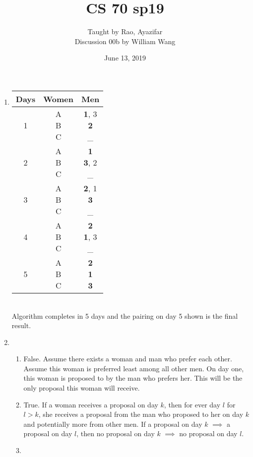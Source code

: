 \documentclass[a4paper]{article}
\title{\textbf{CS 70 sp19}}
\author{\large Taught by Rao, Ayazifar\\
Discussion 00b by William Wang}
\date{June 13, 2019}
\newcommand{\<}{\langle}
\renewcommand{\>}{\rangle}
\renewcommand{\^}{\wedge}
\begin{document}
\maketitle
\begin{enumerate}
    \item 
    \begin{tabular}{|c|c|c|}
    \hline
    Days & Women & Men \\
    \hline
    1 & \makecell{A \\ B \\ C} & \makecell{\textbf{1}, 3 \\ \textbf{2} \\ _} \\
    \hline
    2 & \makecell{A \\ B \\ C} & \makecell{\textbf{1} \\ \textbf{3}, 2 \\ _} \\
    \hline
    3 & \makecell{A \\ B \\ C} & \makecell{\textbf{2}, 1 \\ \textbf{3} \\ _} \\
    \hline
    4 & \makecell{A \\ B \\ C} & \makecell{\textbf{2} \\ \textbf{1}, 3 \\ _} \\
    \hline
    5 & \makecell{A \\ B \\ C} & \makecell{\textbf{2} \\ \textbf{1} \\ \textbf{3}} \\
    \hline
    \end{tabular}
    \\Algorithm completes in 5 days and the pairing on day 5 shown is the final result.
    \item
    \begin{enumerate}
        \item False. Assume there exists a woman and man who prefer each other. Assume this woman is preferred least among all other men. On day one, this woman is proposed to by the man who prefers her. This will be the only proposal this woman will receive.
        \item True. If a woman receives a proposal on day $k$, then for ever day $l$ for $l > k$, she receives a proposal from the man who proposed to her on day $k$ and potentially more from other men. If a proposal on day $k$ $\implies$ a proposal on day $l$, then no proposal on day $k$ $\implies$ no proposal on day $l$.
        \item 
    \end{enumerate}
\end{enumerate}
\newpage
\end{document}
